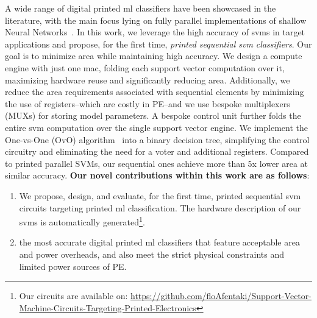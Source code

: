 A wide range of digital printed \gls{ml} classifiers have been showcased in the literature, with the main focus lying on fully parallel implementations of shallow Neural Networks~\cite{Armeniakos:TC2023:codesign,Afentaki:ICCAD23:hollistic,Afentaki:DATE2024:embedding,Mrazek:ICCAD2024}. 
In this work, we leverage the high accuracy of \glspl{svm} in target applications and propose, for the first time, \emph{printed sequential \gls{svm} classifiers}.
Our goal is to minimize area while maintaining high accuracy.
We design a compute engine with just one \gls{mac}, folding each support vector computation over it, maximizing hardware reuse and significantly reducing area.
Additionally, we reduce the area requirements associated with sequential elements by minimizing the use of registers--which are costly in PE--and we use bespoke multiplexers (MUXs) for storing model parameters.
A bespoke control unit further folds the entire \gls{svm} computation over the single support vector engine.
We implement the One-vs-One (OvO) algorithm~\cite{ovo} into a binary decision tree, simplifying the control circuitry and eliminating the need for a voter and additional registers.
Compared to printed parallel SVMs, our sequential ones achieve more than $5$x lower area at similar accuracy.
\textbf{Our novel contributions within this work are as follows}:
\begin{enumerate}[topsep=0pt,leftmargin=*]
\item We propose, design, and evaluate, for the first time, printed sequential \gls{svm} circuits targeting printed \gls{ml} classification.
The hardware description of our \glspl{svm} is automatically generated\footnote{Our circuits are available on:
\href{https://github.com/floAfentaki/Support-Vector-Machine-Circuits-Targeting-Printed-Electronics/tree/main/Compact-And-Highly-Accurate-Printed-Sequential-SVMs_ISCAS2025}{https://github.com/floAfentaki/Support-Vector-Machine-Circuits-Targeting-Printed-Electronics}}. 
\item
 the most accurate digital printed \gls{ml} classifiers that feature acceptable area and power overheads, and also meet the strict physical constraints and limited power sources of PE. 
\end{enumerate}




